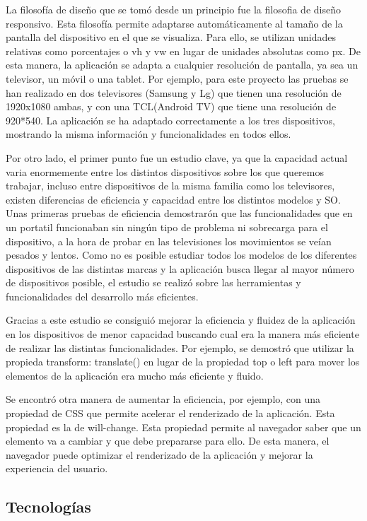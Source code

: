 La filosofía de diseño que se tomó desde un principio fue la filosofia de diseño responsivo. Esta filosofía permite adaptarse
automáticamente al tamaño de la pantalla del dispositivo en el que se visualiza. Para ello, se utilizan unidades relativas
como porcentajes o vh y vw en lugar de unidades absolutas como px. De esta manera, la aplicación se adapta a cualquier
resolución de pantalla, ya sea un televisor, un móvil o una tablet. Por ejemplo, para este proyecto las pruebas se han realizado
en dos televisores (Samsung y Lg) que tienen una resolución de 1920x1080 ambas, y con una TCL(Android TV) que tiene una resolución
de 920*540. La aplicación se ha adaptado correctamente a los tres dispositivos, mostrando la misma información y funcionalidades
en todos ellos. 

Por otro lado, el primer punto fue un estudio clave, ya que la capacidad actual varia enormemente entre los distintos 
dispositivos sobre los que queremos trabajar, incluso entre dispositivos de la misma familia como los televisores,
existen diferencias de eficiencia y capacidad entre los distintos modelos y SO. Unas primeras pruebas de eficiencia
demostrarón que las funcionalidades que en un portatil funcionaban sin ningún tipo de problema ni sobrecarga para el dispositivo,
a la hora de probar en las televisiones los movimientos se veían pesados y lentos. Como no es posible estudiar todos los 
modelos de los diferentes dispositivos de las distintas marcas y la aplicación busca llegar al mayor número de dispositivos posible, 
el estudio se realizó sobre las herramientas y funcionalidades del desarrollo más eficientes.

Gracias a este estudio se consiguió mejorar la eficiencia y fluidez de la aplicación en los dispositivos de menor capacidad
buscando cual era la manera más eficiente de realizar las distintas funcionalidades. Por ejemplo, se demostró que utilizar
la propieda transform: translate() en lugar de la propiedad top o left para mover los elementos de la aplicación era mucho más
eficiente y fluido. 

Se encontró otra manera de aumentar la eficiencia, por ejemplo, con una propiedad de CSS que permite acelerar el renderizado
de la aplicación. Esta propiedad es la de will-change. Esta propiedad permite al navegador saber que un elemento va a cambiar
y que debe prepararse para ello. De esta manera, el navegador puede optimizar el renderizado de la aplicación y mejorar la
experiencia del usuario.


\subsection{Tecnologías}
\label{subsec:analisis_estudio_tecnologias}

